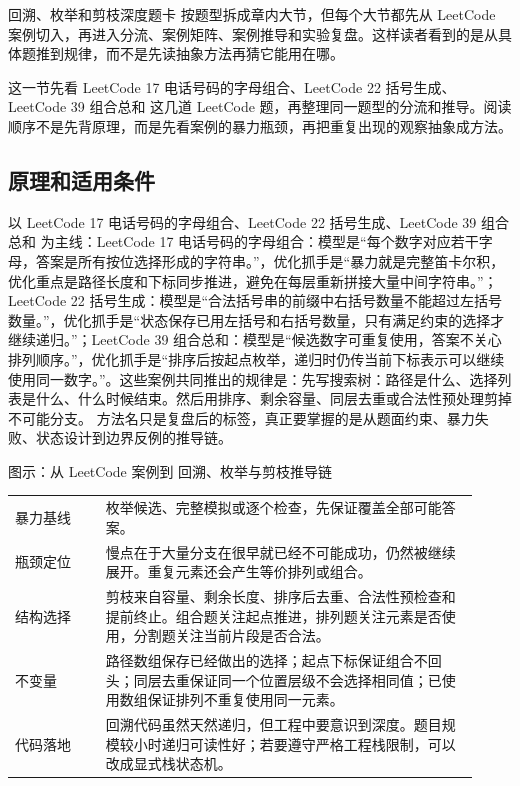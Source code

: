 回溯、枚举和剪枝深度题卡 按题型拆成章内大节，但每个大节都先从 LeetCode 案例切入，再进入分流、案例矩阵、案例推导和实验复盘。这样读者看到的是从具体题推到规律，而不是先读抽象方法再猜它能用在哪。

这一节先看 LeetCode 17 电话号码的字母组合、LeetCode 22 括号生成、LeetCode 39 组合总和 这几道 LeetCode 题，再整理同一题型的分流和推导。阅读顺序不是先背原理，而是先看案例的暴力瓶颈，再把重复出现的观察抽象成方法。

\subsection{原理和适用条件}

以 LeetCode 17 电话号码的字母组合、LeetCode 22 括号生成、LeetCode 39 组合总和 为主线：LeetCode 17 电话号码的字母组合：模型是“每个数字对应若干字母，答案是所有按位选择形成的字符串。”，优化抓手是“暴力就是完整笛卡尔积，优化重点是路径长度和下标同步推进，避免在每层重新拼接大量中间字符串。”；LeetCode 22 括号生成：模型是“合法括号串的前缀中右括号数量不能超过左括号数量。”，优化抓手是“状态保存已用左括号和右括号数量，只有满足约束的选择才继续递归。”；LeetCode 39 组合总和：模型是“候选数字可重复使用，答案不关心排列顺序。”，优化抓手是“排序后按起点枚举，递归时仍传当前下标表示可以继续使用同一数字。”。这些案例共同推出的规律是：先写搜索树：路径是什么、选择列表是什么、什么时候结束。然后用排序、剩余容量、同层去重或合法性预处理剪掉不可能分支。 方法名只是复盘后的标签，真正要掌握的是从题面约束、暴力失败、状态设计到边界反例的推导链。

\begin{principlebox}{图示：从 LeetCode 案例到 回溯、枚举与剪枝推导链}
\begin{tabular}{@{}p{0.18\linewidth}p{0.74\linewidth}@{}}
暴力基线 & 枚举候选、完整模拟或逐个检查，先保证覆盖全部可能答案。\\
瓶颈定位 & 慢点在于大量分支在很早就已经不可能成功，仍然被继续展开。重复元素还会产生等价排列或组合。\\
结构选择 & 剪枝来自容量、剩余长度、排序后去重、合法性预检查和提前终止。组合题关注起点推进，排列题关注元素是否使用，分割题关注当前片段是否合法。\\
不变量 & 路径数组保存已经做出的选择；起点下标保证组合不回头；同层去重保证同一个位置层级不会选择相同值；已使用数组保证排列不重复使用同一元素。\\
代码落地 & 回溯代码虽然天然递归，但工程中要意识到深度。题目规模较小时递归可读性好；若要遵守严格工程栈限制，可以改成显式栈状态机。\\
\end{tabular}
\end{principlebox}

